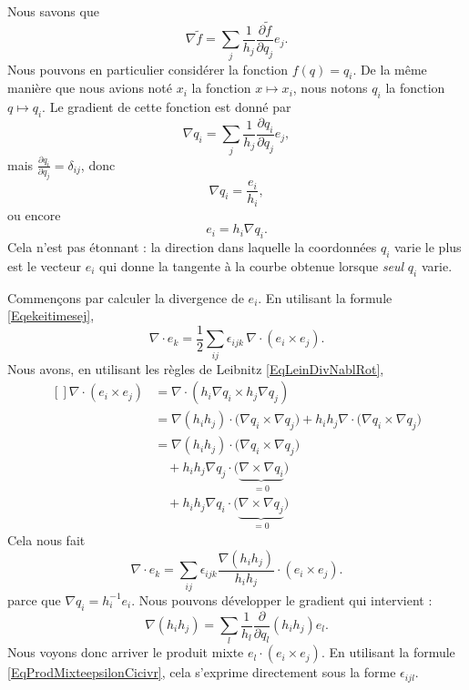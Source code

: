 Nous savons que 
\begin{equation}
    \nabla\tilde f=\sum_j\frac{1}{ h_j }\frac{ \partial \tilde f }{ \partial q_j }e_j.
\end{equation}
Nous pouvons en particulier considérer la fonction $f(q)=q_i$. De la même manière que nous avions noté $x_i$ la fonction $x\mapsto x_i$, nous notons $q_i$ la fonction $q\mapsto q_i$. Le gradient de cette fonction est donné par
\begin{equation}
    \nabla q_i=\sum_j\frac{1}{ h_j }\frac{ \partial q_i }{ \partial q_j }e_j,
\end{equation}
mais $\frac{ \partial q_i }{ \partial q_j }=\delta_{ij}$, donc
\begin{equation}
    \nabla q_i=\frac{ e_i }{ h_i },
\end{equation}
ou encore
\begin{equation}
    e_i=h_i\nabla q_i.
\end{equation}
Cela n'est pas étonnant : la direction dans laquelle la coordonnées $q_i$ varie le plus est le vecteur $e_i$ qui donne la tangente à la courbe obtenue lorsque \emph{seul} $q_i$ varie.

Commençons par calculer la divergence de $e_i$. En utilisant la formule \eqref{Eqekeitimesej},
\begin{equation}
    \nabla\cdot e_k=\frac{ 1 }{2}\sum_{ij}\epsilon_{ijk}\,\nabla\cdot (e_i\times e_j).
\end{equation}
Nous avons, en utilisant les règles de Leibnitz \eqref{EqLeinDivNablRot}, 
\begin{equation}
    \begin{aligned}[]
        \nabla\cdot(e_i\times e_j)&=\nabla\cdot(h_i\nabla q_i\times h_j\nabla q_j)\\
        &=\nabla(h_ih_j)\cdot\big( \nabla q_i\times\nabla q_j \big)+h_ih_j\nabla\cdot\big( \nabla q_i\times\nabla q_j \big)\\
        &=\nabla(h_ih_j)\cdot\big( \nabla q_i\times\nabla q_j \big)\\
        &\quad+h_ih_j\nabla q_j\cdot\big( \underbrace{\nabla\times\nabla q_i}_{=0} \big)\\
        &\quad+h_ih_j\nabla q_i\cdot\big( \underbrace{\nabla\times\nabla q_j}_{=0} \big)
    \end{aligned}
\end{equation}
Cela nous fait
\begin{equation}
    \nabla\cdot e_k=\sum_{ij}\epsilon_{ijk}\frac{ \nabla(h_ih_j) }{ h_ih_j }\cdot (e_i\times e_j).
\end{equation}
parce que $\nabla q_i=h_i^{-1}e_i$. Nous pouvons développer le gradient qui intervient :
\begin{equation}
    \nabla(h_ih_j)=\sum_l\frac{1}{ h_l }\frac{ \partial  }{ \partial q_l }(h_ih_j)e_l.
\end{equation}
Nous voyons donc arriver le produit mixte $e_l\cdot (e_i\times e_j)$. En utilisant la formule \eqref{EqProdMixteepsilonCicivr}, cela s'exprime directement sous la forme $\epsilon_{ijl}$.


